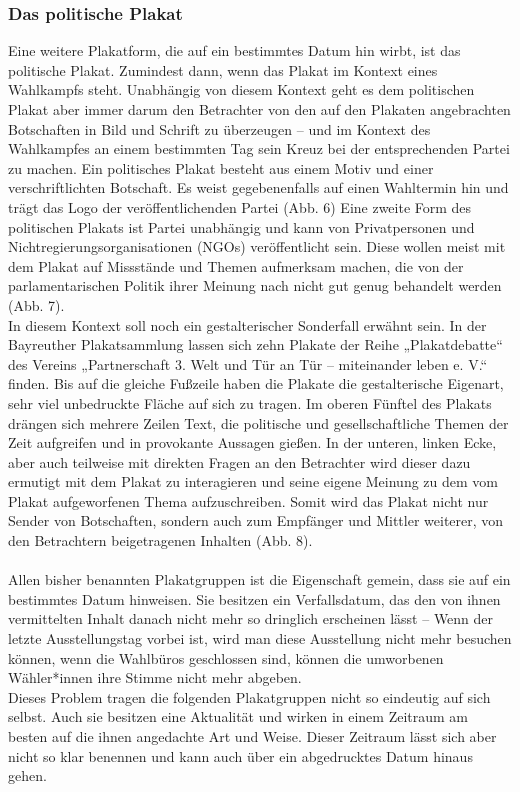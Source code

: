 \documentclass[a4paper,12pt,ngerman]{article}
\begin{document}
\subsubsection{Das politische Plakat}
Eine weitere Plakatform, die auf ein bestimmtes Datum hin wirbt, ist das politische Plakat. Zumindest dann, wenn das Plakat im Kontext eines Wahlkampfs steht. Unabhängig von diesem Kontext geht es dem politischen Plakat aber immer darum den Betrachter von den auf den Plakaten angebrachten Botschaften in Bild und Schrift zu überzeugen – und im Kontext des Wahlkampfes an einem bestimmten Tag sein Kreuz bei der entsprechenden Partei zu machen. Ein politisches Plakat besteht aus einem Motiv und einer verschriftlichten Botschaft. Es weist gegebenenfalls auf einen Wahltermin hin und trägt das Logo der veröffentlichenden Partei (Abb. 6) Eine zweite Form des politischen Plakats ist Partei unabhängig und kann von Privatpersonen und Nichtregierungsorganisationen (NGOs) veröffentlicht sein. Diese wollen meist mit dem Plakat auf Missstände und Themen aufmerksam machen, die von der parlamentarischen Politik ihrer Meinung nach nicht gut genug behandelt werden (Abb. 7). \\
In diesem Kontext soll noch ein gestalterischer Sonderfall erwähnt sein. In der Bayreuther Plakatsammlung lassen sich zehn Plakate der Reihe „Plakatdebatte“ des Vereins „Partnerschaft 3. Welt und Tür an Tür – miteinander leben e. V.“ finden. Bis auf die gleiche Fußzeile haben die Plakate die gestalterische Eigenart, sehr viel unbedruckte Fläche auf sich zu tragen. Im oberen Fünftel des Plakats drängen sich mehrere Zeilen Text, die politische und gesellschaftliche Themen der Zeit aufgreifen und in provokante Aussagen gießen. In der unteren, linken Ecke, aber auch teilweise mit direkten Fragen an den Betrachter wird dieser dazu ermutigt mit dem Plakat zu interagieren und seine eigene Meinung zu dem vom Plakat aufgeworfenen Thema aufzuschreiben. Somit wird das Plakat nicht nur Sender von Botschaften, sondern auch zum Empfänger und Mittler weiterer, von den Betrachtern beigetragenen Inhalten (Abb. 8). \\
\\
Allen bisher benannten Plakatgruppen ist die Eigenschaft gemein, dass sie auf ein bestimmtes Datum hinweisen. Sie besitzen ein Verfallsdatum, das den von ihnen vermittelten Inhalt danach nicht mehr so dringlich erscheinen lässt – Wenn der letzte Ausstellungstag vorbei ist, wird man diese Ausstellung nicht mehr besuchen können, wenn die Wahlbüros geschlossen sind, können die umworbenen Wähler*innen ihre Stimme nicht mehr abgeben.\\
Dieses Problem tragen die folgenden Plakatgruppen nicht so eindeutig auf sich selbst. Auch sie besitzen eine Aktualität und wirken in einem Zeitraum am besten auf die ihnen angedachte Art und Weise. Dieser Zeitraum lässt sich aber nicht so klar benennen und kann auch über ein abgedrucktes Datum hinaus gehen. \\
\end{document}
